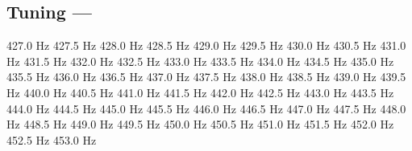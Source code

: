 \subsection[Tuning]{Tuning --- \UiKey{\SET}}















427.0 Hz
427.5 Hz
428.0 Hz
428.5 Hz
429.0 Hz
429.5 Hz
430.0 Hz
430.5 Hz
431.0 Hz
431.5 Hz
432.0 Hz
432.5 Hz
433.0 Hz
433.5 Hz
434.0 Hz
434.5 Hz
435.0 Hz
435.5 Hz
436.0 Hz
436.5 Hz
437.0 Hz
437.5 Hz
438.0 Hz
438.5 Hz
439.0 Hz
439.5 Hz
440.0 Hz
440.5 Hz
441.0 Hz
441.5 Hz
442.0 Hz
442.5 Hz
443.0 Hz
443.5 Hz
444.0 Hz
444.5 Hz
445.0 Hz
445.5 Hz
446.0 Hz
446.5 Hz
447.0 Hz
447.5 Hz
448.0 Hz
448.5 Hz
449.0 Hz
449.5 Hz
450.0 Hz
450.5 Hz
451.0 Hz
451.5 Hz
452.0 Hz
452.5 Hz
453.0 Hz
